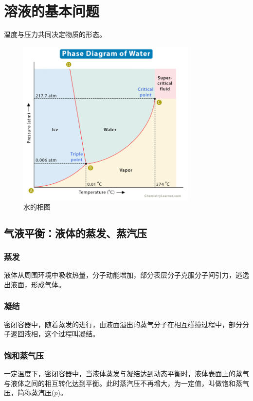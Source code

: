\documentclass[12pt, a4paper, oneside]{ctexbook}
\begin{document}
\section{溶液的基本问题}
温度与压力共同决定物质的形态。\\
\begin{figure}[htbp]
    \centering
    \includegraphics[width=0.8\textwidth]{phase_diagram.jpg}
    \caption{水的相图}
\end{figure}
\subsection{气液平衡：液体的蒸发、蒸汽压}
\subsubsection{蒸发}
液体从周围环境中吸收热量，分子动能增加，部分表层分子克服分子间引力，逃逸出液面，形成气体。\\
\subsubsection{凝结}
密闭容器中，随着蒸发的进行，由液面溢出的蒸气分子在相互碰撞过程中，部分分子返回液相，这个过程叫凝结。\\
\subsubsection{饱和蒸气压}
一定温度下，密闭容器中，当液体蒸发与凝结达到动态平衡时，液体表面上的蒸气与液体之间的相互转化达到平衡。此时蒸汽压不再增大，为一定值，叫做饱和蒸气压，简称蒸汽压($p$)。\\
\end{document}
